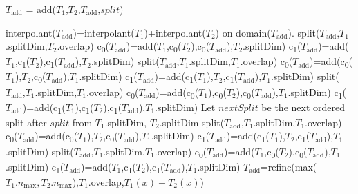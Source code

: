 \documentclass{article}
\newcommand{\nmax}{n_{\text{max}}}
\newcommand{\child}[1]{c\textsubscript{#1}}
\begin{document}
\begin{algorithm}[!h]
\caption{$T_{\mbox{add}}$ = add($T_1$,$T_2$,$T_{\mbox{add}}$,$split$)}
\label{addition2}
\begin{algorithmic}
\STATE interpolant($T_{\mbox{add}}$)=interpolant($T_1$)+interpolant($T_2$) on domain($T_{\mbox{add}}$).
\STATE split($T_{\mbox{add}}$,$T_1$.splitDim,$T_2$.overlap)
\STATE \child{0}($T_{\mbox{add}}$)=add($T_1$,\child{0}($T_2$),\child{0}($T_{\mbox{add}}$),$T_2$.splitDim)
\STATE \child{1}($T_{\mbox{add}}$)=add($T_1$,\child{1}($T_2$),\child{1}($T_{\mbox{add}}$),$T_2$.splitDim)
\STATE split($T_{\mbox{add}}$,$T_1$.splitDim,$T_1$.overlap)
\STATE \child{0}($T_{\mbox{add}}$)=add(\child{0}($T_1$),$T_2$,\child{0}($T_{\mbox{add}}$),$T_1$.splitDim)
\STATE \child{1}($T_{\mbox{add}}$)=add(\child{1}($T_1$),$T_2$,\child{1}($T_{\mbox{add}}$),$T_1$.splitDim)
\STATE split($T_{\mbox{add}}$,$T_1$.splitDim,$T_1$.overlap)
\STATE \child{0}($T_{\mbox{add}}$)=add(\child{0}($T_1$),\child{0}($T_2$),\child{0}($T_{\mbox{add}}$),$T_1$.splitDim)
\STATE \child{1}($T_{\mbox{add}}$)=add(\child{1}($T_1$),\child{1}($T_2$),\child{1}($T_{\mbox{add}}$),$T_1$.splitDim)
\ELSE
\STATE Let $nextSplit$ be the next ordered split after $split$ from $T_1$.splitDim, $T_2$.splitDim
\STATE split($T_{\mbox{add}}$,$T_1$.splitDim,$T_1$.overlap)
\STATE \child{0}($T_{\mbox{add}}$)=add(\child{0}($T_1$),$T_2$,\child{0}($T_{\mbox{add}}$),$T_1$.splitDim)
\STATE \child{1}($T_{\mbox{add}}$)=add(\child{1}($T_1$),$T_2$,\child{1}($T_{\mbox{add}}$),$T_1$.splitDim)
\STATE split($T_{\mbox{add}}$,$T_1$.splitDim,$T_1$.overlap)
\STATE \child{0}($T_{\mbox{add}}$)=add($T_1$,\child{0}($T_2$),\child{0}($T_{\mbox{add}}$),$T_1$.splitDim)
\STATE \child{1}($T_{\mbox{add}}$)=add($T_1$,\child{1}($T_2$),\child{1}($T_{\mbox{add}}$),$T_1$.splitDim)
\ELSE
\STATE $T_{\mbox{add}}$=refine(max($T_1.\nmax,T_2.\nmax$),$T_1$.overlap,$T_1(x)+T_2(x)$)
\ENDIF
\ENDIF
\end{algorithmic}
\end{algorithm}
\end{document}
